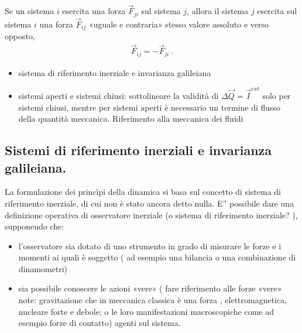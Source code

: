 \documentclass[letterpaper,10pt,italian]{jupyterBook}
\begin{document}
\sphinxAtStartPar
{} Se un sistema \(i\) esercita una forza \(\vec{F}_{ji}\) sul sistema \(j\), allora il sistema \(j\) esercita sul sistema \(i\) una forza \(\vec{F}_{ij}\) «uguale e contraria» \sphinxhyphen{} stesso valore assoluto e verso opposto,
\begin{equation*}
\begin{split}\vec{F}_{ij} = - \vec{F}_{ji} \ .\end{split}
\end{equation*}
\sphinxAtStartPar
{} 
\begin{itemize}
\item {} 
\sphinxAtStartPar
sistema di riferimento inerziale e invarianza galileiana

\item {} 
\sphinxAtStartPar
sistemi aperti e sistemi chiusi: sottolineare la validità di \(\Delta \vec{Q} = \vec{I}^{ext}\) solo per sistemi chiusi, mentre per sistemi aperti è necessario un termine di flusso della quantità meccanica. Riferimento alla meccanica dei fluidi

\end{itemize}


\subsection{Sistemi di riferimento inerziali e invarianza galileiana.}
\label{\detokenize{ch/mechanics/dynamics-principles:sistemi-di-riferimento-inerziali-e-invarianza-galileiana}}\label{\detokenize{ch/mechanics/dynamics-principles:physics-hs-mechanics-dynamics-principles-inertial-ref-frame}}
\sphinxAtStartPar
La formulazione dei princìpi della dinamica si basa sul concetto di sistema di riferimento inerziale, di cui non è stato ancora detto nulla.
E” possibile dare una definizione operativa di osservatore inerziale (o sistema di riferimento inerziale? ), supponendo che:
\begin{itemize}
\item {} 
\sphinxAtStartPar
l’osservatore sia dotato di uno strumento in grado di misurare le forze e i momenti ai quali è soggetto ( ad esempio una bilancia o una combinazione di dinamometri)

\item {} 
\sphinxAtStartPar
sia possibile conoscere le azioni «vere» ( fare riferimento alle forze «vere» note: gravitazione \sphinxhyphen{} che in meccanica classica è una forza \sphinxhyphen{}, elettromagnetica, nucleare forte e debole; o le loro manifestazioni macroscopiche come ad esempio forze di contatto) agenti sul sistema.

\end{itemize}
\end{document}
